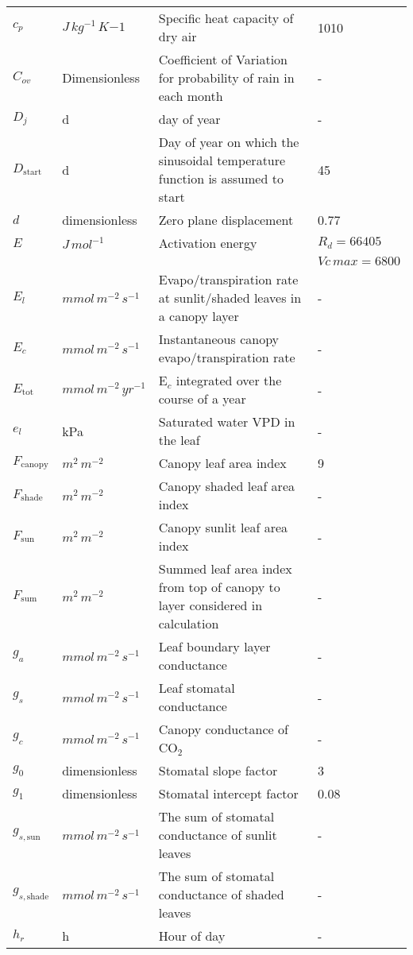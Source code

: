 \documentclass[12pt,fullpage]{report}
\begin{document}
\begin{center}
\begin{longtable}{l l p{3in} p{0.5in}}
$c_p$	&	$J\, kg^{-1}\, K{-1}$	&	Specific heat capacity of dry air 	&	1010	\\
$C_{ov}$	&	Dimensionless	&	Coefficient of Variation for probability of rain in each month	&	-	\\
$D_j$	&	d	&	day of year	&	-	\\
$D_{\text{start}}$	&	d	&	Day of year on which the sinusoidal temperature function is assumed to start	&	45	\\
$d$	&	dimensionless	&	Zero plane displacement	&	0.77	\\
$E$	&	$J\, mol^{-1}$	&	Activation energy	&	$R_{d}=66405$	\\
	&		&		&	$Vc\,max=6800$	\\
$E_l$	&	$mmol\,m^{-2}\,s^{-1}$ 	&	Evapo/transpiration rate at sunlit/shaded leaves in a canopy layer	&	-	\\
$E_c$	&	$mmol\,m^{-2}\, s^{-1}$	&	Instantaneous canopy evapo/transpiration rate	&	-	\\
$E_{\text{tot}}$	&	$mmol\, m^{-2}\, yr^{-1}$	&	E$_c$ integrated over the course of a year	&	-	\\
$e_l$	&	kPa	&	Saturated water VPD in the leaf	&	-	\\
$F_{\text{canopy}}$	&	$m^2\, m^{-2}$	&	Canopy leaf area index	&	9	\\
$F_{\text{shade}}$	&	$m^2\, m^{-2}$	&	Canopy shaded leaf area index	&	-	\\
$F_{\text{sun}}$	&	$m^2\,m^{-2}$	&	Canopy sunlit leaf area index	&	-	\\
$F_{\text{sum}}$	&	$m^2\, m^{-2}$	&	Summed leaf area index from top of canopy to layer considered in calculation	&	-	\\
$g_a$	&	$mmol\,m^{-2}\, s^{-1}$	&	Leaf boundary layer conductance	&	-	\\
$g_s$	&	$mmol\,m^{-2}\, s^{-1}$	&	Leaf stomatal conductance	&	-	\\
$g_c$	&	$mmol\,m^{-2}\, s^{-1}$	&	Canopy conductance of CO$_2$ 	&	-	\\
$g_0$	&	dimensionless	&	Stomatal slope factor	&	3	\\
$g_1$	&	dimensionless	&	Stomatal intercept factor	&	0.08	\\
$g_{s,\text{sun}}$	&	$mmol\, m^{-2}\, s^{-1}$	&	The sum of stomatal conductance of sunlit leaves	&	-	\\
$g_{s,\text{shade}}$	&	$mmol\, m^{-2}\, s^{-1}$	&	The sum of stomatal conductance of shaded leaves	&	-	\\
$h_r$	&	h	&	Hour of day	&	-	\\

\end{longtable}
\end{center}
\end{document}
